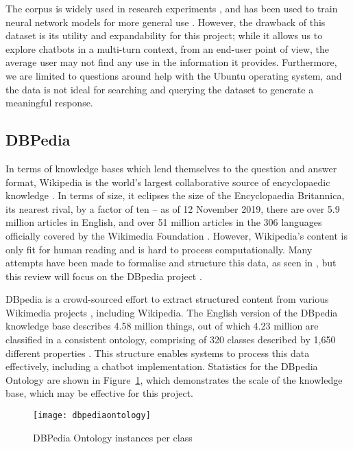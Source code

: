 The corpus is widely used in research experiments \cite{kadlec2015improved}, and has been used to train neural network models for more general use \cite{lowe2017training}. However, the drawback of this dataset is its utility and expandability for this project; while it allows us to explore chatbots in a multi-turn context, from an end-user point of view, the average user may not find any use in the information it provides. Furthermore, we are limited to questions around help with the Ubuntu operating system, and the data is not ideal for searching and querying the dataset to generate a meaningful response. 

\newpage
\subsection{DBPedia}
In terms of knowledge bases which lend themselves to the question and answer format, Wikipedia is the world’s largest collaborative source of encyclopaedic knowledge \cite{volkel2006semantic}. In terms of size, it eclipses the size of the Encyclopaedia Britannica, its nearest rival, by a factor of ten \cite{medelyan2009mining} -- as of 12 November 2019, there are over 5.9 million articles in English, and over 51 million articles in the 306 languages officially covered by the Wikimedia Foundation \cite{wikimedia2019}. However, Wikipedia’s content is only fit for human reading \cite{volkel2006semantic} and is hard to process computationally. Many attempts have been made to formalise and structure this data, as seen in \cite{volkel2006semantic, medelyan2009mining, wu2007autonomously}, but this review will focus on the DBpedia project \cite{lehmann2015dbpedia}.

DBpedia is a crowd-sourced effort to extract structured content from various Wikimedia projects \cite{dbpedia2019about}, including Wikipedia. The English version of the DBpedia knowledge base describes 4.58 million things, out of which 4.23 million are classified in a consistent ontology, comprising of 320 classes described by 1,650 different properties \cite{dbpedia2019ontology}. This structure enables systems to process this data effectively, including a chatbot implementation. Statistics for the DBpedia Ontology are shown in Figure~\ref{fig:ontology}, which demonstrates the scale of the knowledge base, which may be effective for this project.

\begin{figure}[h]
	\begin{center}
		\texttt{[image: dbpediaontology]}
	\end{center}
	\caption{DBPedia Ontology instances per class \cite{dbpedia2019ontology}}
	\label{fig:ontology}
\end{figure}

